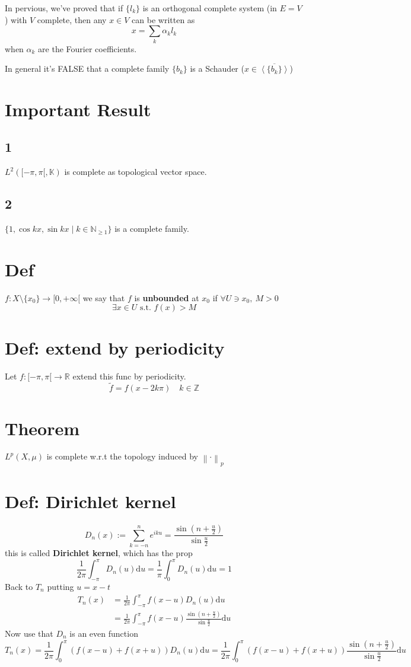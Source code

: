 \documentclass{book}
\newcommand{\leftbracket}{[}
\newcommand{\norm}[1]{\left\lVert #1 \right\rVert}
\begin{document}
In pervious, we've proved that if $\{l_k\}$ is an orthogonal complete system (in $E=V$) with $V$ complete, then any $x\in V$ can be written as$$x=\sum\limits_k\alpha_kl_k$$ when $\alpha_k$ are the Fourier coefficients.

In general it's FALSE that a complete family $\{b_k\}$ is a Schauder ($x\in \overline{\left<\{b_k\}\right>}$)
\section{Important Result}
\subsection*{1}
$L^2(\leftbracket -\pi,\pi\leftbracket,\mathbb{K})$ is complete as topological vector space.
\subsection*{2}$\{1,\cos kx,\sin kx\mid k\in \mathbb{N}_{\geq 1}\}$ is a complete family.
\section{Def}
$f:X\setminus\{x_0\}\rightarrow\leftbracket 0,+\infty\leftbracket$ we say that $f$ is \textbf{unbounded} at $x_0$ if $\forall U\ni x_0,\ M>0$$$ \exists x\in U \text{ s.t. }f(x)>M$$
\section{Def: extend by periodicity}
Let $f:\leftbracket -\pi,\pi\leftbracket\rightarrow \mathbb{R}$ extend this func by periodicity.
$$\tilde{f}=f(x-2k\pi)\quad k\in\mathbb{Z}$$

\section{Theorem}
\label{Lp complete}
$L^p(X,\mu)$ is complete w.r.t the topology induced by $\norm\cdot_p$
\section{Def: Dirichlet kernel}$$D_n(x):=\sum\limits_{k=-n}^ne^{iku}=\frac{\sin(n+\frac{u}2)}{\sin\frac{u}2}$$
this is called \textbf{Dirichlet kernel}, which has the prop
$$\frac{1}{2\pi}\int_{-\pi}^\pi D_n(u)\text{d}u=\frac{1}{\pi}\int_0^\pi D_n(u)\text{d}u=1$$
Back to $T_n$ putting $u=x-t$
$$\begin{aligned}
    T_n(x)&=\frac{1}{2\pi}\int_{-\pi}^\pi f(x-u)D_n(u)\text{d}u\\
    &=\frac{1}{2\pi}\int_{-\pi}^\pi f(x-u)\frac{\sin(n+\frac{u}2)}{\sin\frac{u}2}\text{d}u
\end{aligned}$$
Now use that $D_n$ is an even function
$$T_n(x)=\frac{1}{2\pi}\int_0^\pi \left(f(x-u)+f(x+u)\right)D_n(u)\text{d}u=\frac{1}{2\pi}\int_0^\pi\left(f(x-u)+f(x+u)\right)\frac{\sin(n+\frac{u}2)}{\sin\frac{u}2}\text{d}u$$
\end{document}
